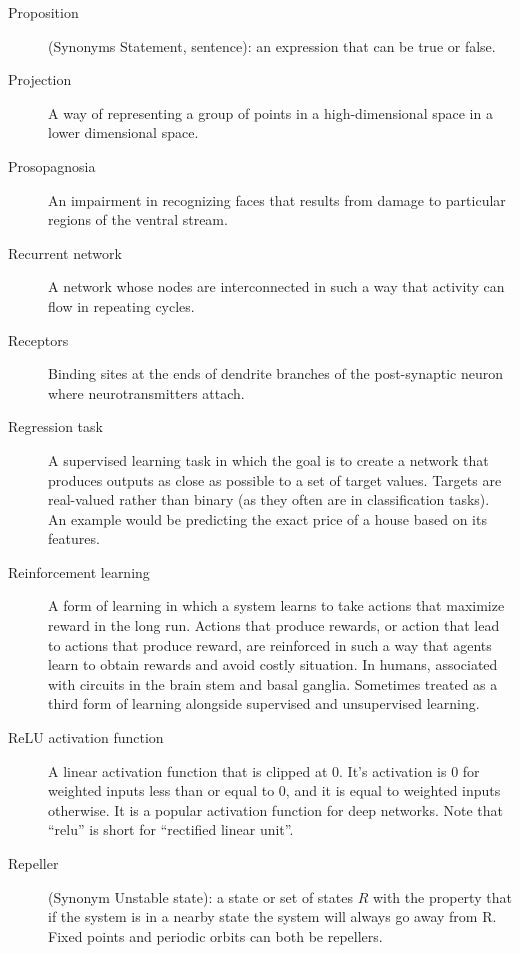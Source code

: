 \begin{description}
\item[Proposition] (Synonyms Statement, sentence): an expression that can be true or false.

\item[Projection] A way of representing a group of points in a high-dimensional space in a lower dimensional space.

\item[Prosopagnosia] An impairment in recognizing faces that results from damage to particular regions of the ventral stream.


\item[Recurrent network] A network whose nodes are interconnected in such a way that activity can flow in repeating cycles.

\item[Receptors] Binding sites at the ends of dendrite branches of the post-synaptic neuron where neurotransmitters attach.


\item[Regression task] A supervised learning task in which the goal is to create a network that produces outputs as close as possible to a set of target values. Targets are real-valued rather than binary (as they often are in classification tasks). An example would be predicting the exact price of a house based on its features.

\item[Reinforcement learning] A form of learning in which a system learns to take actions that maximize reward in the long run.   Actions that produce rewards, or action that lead to actions that produce reward, are reinforced in such a way that agents learn to obtain rewards and avoid costly situation.  In humans, associated with circuits in the brain stem and basal ganglia.  Sometimes treated as a third form of learning alongside supervised and unsupervised learning.

\item[ReLU activation function] A linear activation function that is clipped at  0. It's activation is 0 for weighted inputs less than or equal to 0, and it is equal to weighted inputs otherwise. It is a popular activation function for deep networks. Note that ``relu'' is short for ``rectified linear unit''.

\item[Repeller] (Synonym Unstable state): a state or set of states $R$ with the property that if the system is in a nearby state the system will always go away from R. Fixed points and periodic orbits can both be repellers.


\end{description}
